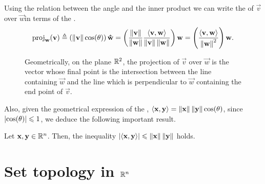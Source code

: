 Using the relation between the angle and the inner product we can write the  of $\vec{v}$ 
over $\vec{w} $in terms of the .
\begin{equation}
    \ovproj{\vec{w}}{\vec{v}}\bydef\left(\vnorm{\vec{v}}\cos(\theta)\right)\uvec{w} = \left(\frac{\vnorm{\vec{v}}}{\vnorm{\vec{w}}}
    \frac{\innerp{\vec{v}, \vec{w}}}{\vnorm{\vec{v}}\vnorm{\vec{w}}}\right)\vec{w} = \left(\frac{\innerp{\vec{v}, 
    \vec{w}}}{\vnorm{\vec{w}}^2}
\right)\vec{w}.
\end{equation}
\newpage
\begin{figure}[htbp]\label{fig:ortho-proj}
    \centering{}
    \caption{Geometrically, on the plane $\R^2$, the projection of $\vec{v}$ over $\vec{w}$ is the vector whose final point is the intersection
between the line containing $\vec{w}$ and the line which is perpendicular to $\vec{w}$ containing the end point of $\vec{v}$.}
\end{figure}

Also, given the geometrical expression of the , $\langle \mathbf{x}, \mathbf{y} \rangle = \left\Vert \mathbf{x} \right\Vert
\left\Vert \mathbf{y} \right\Vert\cos(\theta)$, since $\abs{\cos(\theta)}\leqslant 1$, we deduce the following important result.

\begin{lemma}
    Let $\vec{x}, \vec{y}\in\Rtn$. Then, the inequality $\abs{\langle \mathbf{x}, \mathbf{y} \rangle}\leqslant \left\Vert \mathbf{x} \right\Vert\left\Vert \mathbf{y} \right\Vert$
    holds.
\end{lemma}



\section{Set topology in $\Rtn$}

